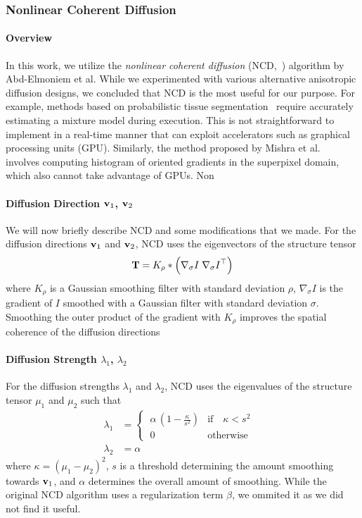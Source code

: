 \subsubsection{Nonlinear Coherent Diffusion}
\paragraph{Overview}
In this work, we utilize the \textit{nonlinear coherent diffusion} (NCD,~\cite{abd-elmoniem_realtime_2002}) algorithm by Abd-Elmoniem et al.
While we experimented with various alternative anisotropic diffusion designs, we concluded that NCD is the most useful for our purpose.
For example, methods based on probabilistic tissue segmentation~\cite{hutchison_probabilisticdriven_2010, ramos-llorden_anisotropic_2015} require accurately estimating a mixture model during execution.
This is not straightforward to implement in a real-time manner that can exploit accelerators such as graphical processing units (GPU).
Similarly, the method proposed by Mishra et al.~\cite{mishra_edge_2018} involves computing histogram of oriented gradients in the superpixel domain, which also cannot take advantage of GPUs.
Non

\paragraph{Diffusion Direction \(\mathbf{v}_1\), \(\mathbf{v}_2\)}
We will now briefly describe NCD and some modifications that we made.
For the diffusion directions \(\mathbf{v}_1\) and \(\mathbf{v}_2\), NCD uses the eigenvectors of the structure tensor 
\begin{align}
  \mathbf{T} = K_{\rho} * \left( \nabla_{\sigma} I \; {\nabla_{\sigma} I}^{\top} \right) 
\end{align}
where \(K_{\rho}\) is a Gaussian smoothing filter with standard deviation \(\rho\), \(\nabla_{\sigma}I\) is the gradient of \(I\) smoothed with a Gaussian filter with standard deviation \(\sigma\).
Smoothing the outer product of the gradient with \(K_{\rho}\) improves the spatial coherence of the diffusion directions

\paragraph{Diffusion Strength \(\lambda_1\), \(\lambda_2\)}
For the diffusion strengths \(\lambda_1\) and \(\lambda_2\), NCD uses the eigenvalues of the structure tensor \(\mu_1\) and \(\mu_2\) such that
\begin{align}
  \lambda_1 &= \begin{cases}
    \; \alpha \, \left(1 - \frac{\kappa}{s^2}\right) &  \text{if}\quad \kappa < s^2  \\
    \; 0 & \text{otherwise}\quad
    \end{cases} \\
  \lambda_2 &= \alpha
\end{align}
where \(\kappa = {(\mu_1 - \mu_2)}^2\), \(s\) is a threshold determining the amount smoothing towards \(\mathbf{v}_1\), and \(\alpha\) determines the overall amount of smoothing.
While the original NCD algorithm uses a regularization term \(\beta\), we ommited it as we did not find it useful.

